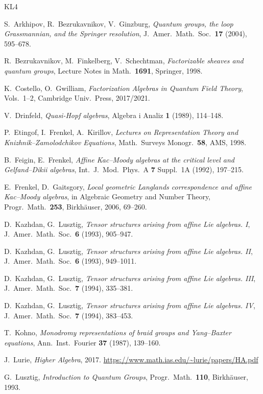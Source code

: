 \documentclass[11pt]{article}
\theoremstyle{definition}
\theoremstyle{remark}
\begin{document}

\begin{thebibliography}{KL4}

S.~Arkhipov, R.~Bezrukavnikov, V.~Ginzburg,
\emph{Quantum groups, the loop Grassmannian, and the Springer resolution},
J.\ Amer.\ Math.\ Soc.\ \textbf{17} (2004), 595--678.

R.~Bezrukavnikov, M.~Finkelberg, V.~Schechtman,
\emph{Factorizable sheaves and quantum groups},
Lecture Notes in Math.\ \textbf{1691}, Springer, 1998.

K.~Costello, O.~Gwilliam,
\emph{Factorization Algebras in Quantum Field Theory}, Vols.\ 1--2,
Cambridge Univ.\ Press, 2017/2021.

V.~Drinfeld,
\emph{Quasi-Hopf algebras},
Algebra i Analiz \textbf{1} (1989), 114--148.

P.~Etingof, I.~Frenkel, A.~Kirillov,
\emph{Lectures on Representation Theory and Knizhnik--Zamolodchikov Equations},
Math.\ Surveys Monogr.\ \textbf{58}, AMS, 1998.

B.~Feigin, E.~Frenkel,
\emph{Affine Kac--Moody algebras at the critical level and Gelfand--Dikii algebras},
Int.\ J.\ Mod.\ Phys.\ A \textbf{7} Suppl.\ 1A (1992), 197--215.

E.~Frenkel, D.~Gaitsgory,
\emph{Local geometric Langlands correspondence and affine Kac--Moody algebras},
in Algebraic Geometry and Number Theory, Progr.\ Math.\ \textbf{253},
Birkh\"auser, 2006, 69--260.

D.~Kazhdan, G.~Lusztig,
\emph{Tensor structures arising from affine Lie algebras. I},
J.\ Amer.\ Math.\ Soc.\ \textbf{6} (1993), 905--947.

D.~Kazhdan, G.~Lusztig,
\emph{Tensor structures arising from affine Lie algebras. II},
J.\ Amer.\ Math.\ Soc.\ \textbf{6} (1993), 949--1011.

D.~Kazhdan, G.~Lusztig,
\emph{Tensor structures arising from affine Lie algebras. III},
J.\ Amer.\ Math.\ Soc.\ \textbf{7} (1994), 335--381.

D.~Kazhdan, G.~Lusztig,
\emph{Tensor structures arising from affine Lie algebras. IV},
J.\ Amer.\ Math.\ Soc.\ \textbf{7} (1994), 383--453.

T.~Kohno,
\emph{Monodromy representations of braid groups and Yang--Baxter equations},
Ann.\ Inst.\ Fourier \textbf{37} (1987), 139--160.

J.~Lurie,
\emph{Higher Algebra}, 2017.
\url{https://www.math.ias.edu/~lurie/papers/HA.pdf}

G.~Lusztig,
\emph{Introduction to Quantum Groups},
Progr.\ Math.\ \textbf{110}, Birkh\"auser, 1993.

\end{thebibliography}
\end{document}
